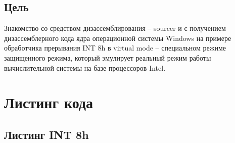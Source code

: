 \setcounter{page}{2}

\subsection*{Цель}

Знакомство со средством дизассемблирования – sourcer и с
получением дизассемблерного кода ядра операционной системы Windows на примере обработчика прерывания INT 8h в virtual mode – специальном режиме защищенного режима, который эмулирует реальный режим работы вычислительной системы на базе процессоров Intel.

\section*{Листинг кода}

\subsection*{Листинг INT 8h}

